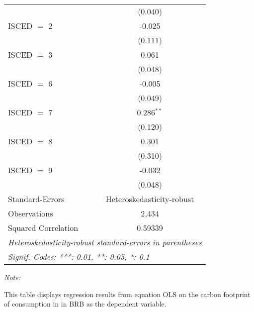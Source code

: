 \begin{table}[htbp!]
\begin{adjustbox}{width = 1\textwidth, max height = 0.95\textheight, center}
\begin{threeparttable}[b]
\begin{tabular}{lc}
                                & (0.040)\\   
            ISCED $=$ 2         & -0.025\\   
                                & (0.111)\\   
            ISCED $=$ 3         & 0.061\\   
                                & (0.048)\\   
            ISCED $=$ 6         & -0.005\\   
                                & (0.049)\\   
            ISCED $=$ 7         & 0.286$^{**}$\\   
                                & (0.120)\\   
            ISCED $=$ 8         & 0.301\\   
                                & (0.310)\\   
            ISCED $=$ 9         & -0.032\\   
                                & (0.048)\\   
            \midrule 
            Standard-Errors     & Heteroskedasticity-robust \\   
            Observations        & 2,434\\  
            Squared Correlation & 0.59339\\  
            \midrule \midrule
            \multicolumn{2}{l}{\emph{Heteroskedasticity-robust standard-errors in parentheses}}\\
            \multicolumn{2}{l}{\emph{Signif. Codes: ***: 0.01, **: 0.05, *: 0.1}}\\
         \end{tabular}
         
         \begin{tablenotes}\item \medskip \textit{Note:}
            \item This table displays regression results from equation OLS on the carbon footprint of consumption in  in BRB as the dependent variable.  
         \end{tablenotes}
      \end{threeparttable}
   \end{adjustbox}
\end{table}


